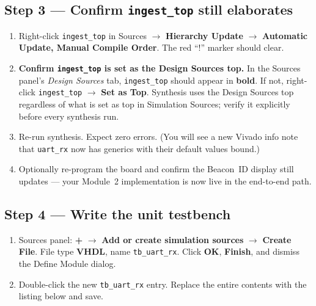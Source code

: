 \documentclass[11pt,letterpaper]{article}
\begin{document}
\subsection{Step 3 --- Confirm \texttt{ingest\_top} still elaborates}
\begin{enumerate}[leftmargin=2em]
	\item Right-click \texttt{ingest\_top} in Sources $\to$ \textbf{Hierarchy Update} $\to$ \textbf{Automatic Update, Manual Compile Order}. The red ``!'' marker should clear.
	\item \textbf{Confirm \texttt{ingest\_top} is set as the Design Sources top.} In the Sources panel's \textit{Design Sources} tab, \texttt{ingest\_top} should appear in \textbf{bold}. If not, right-click \texttt{ingest\_top} $\to$ \textbf{Set as Top}. Synthesis uses the Design Sources top regardless of what is set as top in Simulation Sources; verify it explicitly before every synthesis run.
	\item Re-run synthesis. Expect zero errors. (You will see a new Vivado info note that \texttt{uart\_rx} now has generics with their default values bound.)
	\item Optionally re-program the board and confirm the Beacon~ID display still updates --- your Module~2 implementation is now live in the end-to-end path.
\end{enumerate}

\subsection{Step 4 --- Write the unit testbench}

\begin{enumerate}[leftmargin=2em]
	\item Sources panel: \textbf{+} $\to$ \textbf{Add or create simulation sources} $\to$ \textbf{Create File}. File type \textbf{VHDL}, name \texttt{tb\_uart\_rx}. Click \textbf{OK}, \textbf{Finish}, and dismiss the Define Module dialog.
	\item Double-click the new \texttt{tb\_uart\_rx} entry. Replace the entire contents with the listing below and save.
\end{enumerate}
\end{document}

